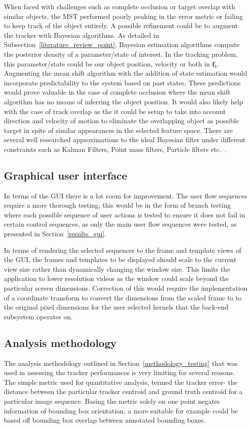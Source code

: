 When faced with challenges such as complete occlusion or target overlap with
similar objects, the MST performed poorly peaking in the error metric or failing
to keep track of the object entirely. A possible refinement could be to augment
the tracker with Bayesian algorithms. As detailed in
Subsection~\ref{literature_review_point}, Bayesian estimation algorithms compute
the posterior density of a parameter/state of interest. In the tracking
problem, this parameter/state could be our object position, velocity or both in
$\mathbf{f}_k$. 
Augmenting the mean shift algorithm with the addition of state estimation  would
incorporate predictability to the system based on past states. These predictions
would prove valuable in the case of complete occlusion where the mean shift
algorithm has no means of inferring the object position. It would also likely
help with the case of track overlap as the it could be setup to take into
account direction and velocity of motion to eliminate the overlapping object as
possible target in spite of similar appearances in the selected
feature space.
There are several well researched approximations to the ideal Bayesian filter
under different constraints such as Kalman Filters, Point mass filters, Particle
filters etc.~\cite{Challa2011}.  

\subsection{Graphical user interface}\label{future_gui}
In terms of the GUI there is a lot room for improvement. The user flow sequences
require a more thorough testing, this would be in the form of branch testing where
each possible sequence of user actions is tested to ensure it does not fail in
certain control sequences, as only the main user flow sequences were tested, as
presented in Section~\ref{results_gui}.

In terms of rendering the selected sequences to the frame and template views
of the GUI, the frames and templates to be displayed should scale to the current
view size rather than dynamically changing the window size. This limits the
application to lower resolution videos as the window could scale beyond the
particular screen dimensions.
Correction of this would require the implementation of a coordinate transform
to convert the dimensions from the scaled frame to to the original pixel
dimensions for the user selected kernels that the back-end subsystem operates on.

\subsection{Analysis methodology}\label{future_analysis}
The analysis methodology outlined in Section~\ref{methodology_testing} that was
used in assessing the tracker performances is very limiting for several reasons.
The simple metric used for quantitative analysis, termed the tracker error- the
distance between the particular tracker centroid and ground truth centroid for a
particular image sequence. Basing the metric solely on one point negates
information of bounding box orientation, a more suitable for example could be
based off bounding box overlap between annotated bounding boxes. 

